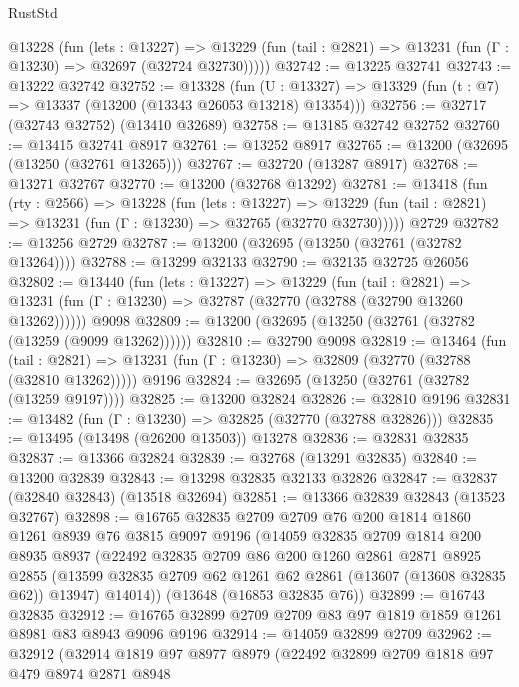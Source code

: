 \begin{lexlean}{RustStd}
\begin{coremodule}
    @13228
      (fun (lets : @13227) =>
      @13229 (fun (tail : @2821) => @13231 (fun (Γ : @13230) => @32697 (@32724 @32730)))))
@32742 := @13225 @32741
@32743 := @13222 @32742
@32752 := @13328
    (fun (U : @13327) => @13329 (fun (t : @7) => @13337 (@13200 (@13343 @26053 @13218) @13354)))
@32756 := @32717 (@32743 @32752) (@13410 @32689)
@32758 := @13185 @32742 @32752
@32760 := @13415 @32741 @8917
@32761 := @13252 @8917
@32765 := @13200 (@32695 (@13250 (@32761 @13265)))
@32767 := @32720 (@13287 @8917)
@32768 := @13271 @32767
@32770 := @13200 (@32768 @13292)
@32781 := @13418
    (fun (rty : @2566) =>
    @13228
      (fun (lets : @13227) =>
      @13229 (fun (tail : @2821) => @13231 (fun (Γ : @13230) => @32765 (@32770 @32730)))))
    @2729
@32782 := @13256 @2729
@32787 := @13200 (@32695 (@13250 (@32761 (@32782 @13264))))
@32788 := @13299 @32133
@32790 := @32135 @32725 @26056
@32802 := @13440
    (fun (lets : @13227) =>
    @13229
      (fun (tail : @2821) =>
      @13231 (fun (Γ : @13230) => @32787 (@32770 (@32788 (@32790 @13260 @13262))))))
    @9098
@32809 := @13200 (@32695 (@13250 (@32761 (@32782 (@13259 (@9099 @13262))))))
@32810 := @32790 @9098
@32819 := @13464
    (fun (tail : @2821) => @13231 (fun (Γ : @13230) => @32809 (@32770 (@32788 (@32810 @13262)))))
    @9196
@32824 := @32695 (@13250 (@32761 (@32782 (@13259 @9197))))
@32825 := @13200 @32824
@32826 := @32810 @9196
@32831 := @13482 (fun (Γ : @13230) => @32825 (@32770 (@32788 @32826)))
@32835 := @13495 (@13498 (@26200 @13503)) @13278
@32836 := @32831 @32835
@32837 := @13366 @32824
@32839 := @32768 (@13291 @32835)
@32840 := @13200 @32839
@32843 := @13298 @32835 @32133 @32826
@32847 := @32837 (@32840 @32843) (@13518 @32694)
@32851 := @13366 @32839 @32843 (@13523 @32767)
@32898 := @16765
    @32835
    @2709
    @2709
    @76
    @200
    @1814
    @1860
    @1261
    @8939
    @76
    @3815
    @9097
    @9196
    (@14059
      @32835
      @2709
      @1814
      @200
      @8935
      @8937
      (@22492
        @32835
        @2709
        @86
        @200
        @1260
        @2861
        @2871
        @8925
        @2855
        (@13599 @32835 @2709 @62 @1261 @62 @2861 (@13607 (@13608 @32835 @62)) @13947)
        @14014))
    (@13648 (@16853 @32835 @76))
@32899 := @16743 @32835
@32912 := @16765 @32899 @2709 @2709 @83 @97 @1819 @1859 @1261 @8981 @83 @8943 @9096 @9196
@32914 := @14059 @32899 @2709
@32962 := @32912
    (@32914
      @1819
      @97
      @8977
      @8979
      (@22492
        @32899
        @2709
        @1818
        @97
        @479
        @8974
        @2871
        @8948

\end{coremodule}
\end{lexlean}
